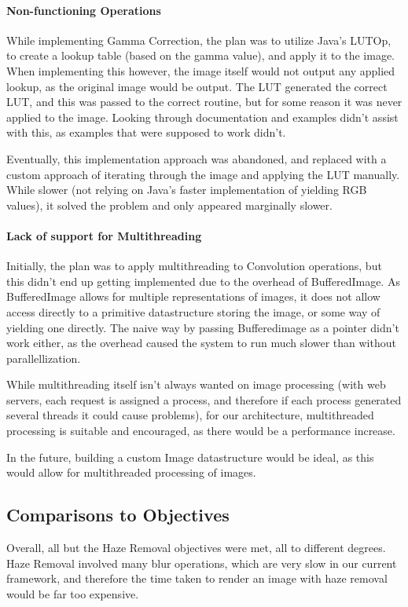 \documentclass[11pt,a4paper]{article}
\begin{document}
\paragraph{Non-functioning Operations}
While implementing Gamma Correction, the plan was to utilize Java's LUTOp, to create a lookup table (based on the gamma value),
and apply it to the image. When implementing this however, the image itself would not output any applied lookup, as the original image would be output.
The LUT generated the correct LUT, and this was passed to the correct routine, but for some reason it was never applied to the image. Looking through
documentation and examples didn't assist with this, as examples that were supposed to work didn't.

Eventually, this implementation approach was abandoned, and replaced with a custom approach of iterating through the image and applying the LUT
manually. While slower (not relying on Java's faster implementation of yielding RGB values), it solved the problem and only appeared marginally slower.

\paragraph{Lack of support for Multithreading}
Initially, the plan was to apply multithreading to Convolution operations, but this didn't end up getting implemented due to the overhead of BufferedImage.
As BufferedImage allows for multiple representations of images, it does not allow access directly to a primitive datastructure storing the image, or some way of
yielding one directly. The naive way by passing Bufferedimage as a pointer didn't work either, as the overhead caused the system to run much slower than without parallellization.

While multithreading itself isn't always wanted on image processing (with web servers, each request is assigned a process, and therefore if each process generated several threads it could
cause problems), for our architecture, multithreaded processing is suitable and encouraged, as there would be a performance increase.

In the future, building a custom Image datastructure would be ideal, as this would allow for multithreaded processing of images.

\subsection{Comparisons to Objectives}
Overall, all but the Haze Removal objectives were met, all to different degrees. Haze Removal involved many blur operations, which are very slow in our current framework, and therefore the
time taken to render an image with haze removal would be far too expensive. 
\end{document}
